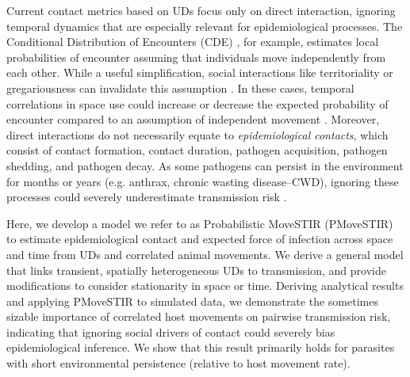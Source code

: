 \documentclass[letterpaper]{article}
\begin{document}
Current contact metrics based on UDs focus only on direct interaction, ignoring temporal dynamics that are especially relevant for epidemiological processes. The Conditional Distribution of Encounters (CDE) \citep{Noonan2021}, for example, estimates local probabilities of encounter assuming that individuals move independently from each other.
While a useful simplification, social interactions like territoriality or gregariousness can invalidate this assumption \citep{Manlove2018,Sah2018}. In these cases, temporal correlations in space use could increase or decrease the expected probability of encounter compared to an assumption of independent movement \citep{Kjaer2008,Schauber2015a}. 
Moreover, direct interactions do not necessarily equate to \emph{epidemiological contacts}, which consist of contact formation, contact duration, pathogen acquisition, pathogen shedding, and pathogen decay. As some pathogens can persist in the environment for months or years (e.g. anthrax, chronic wasting disease--CWD), ignoring these processes could severely underestimate transmission risk \citep{Wilber2022,Yang2023,Richardson2015}.


Here, we develop a model we refer to as Probabilistic MoveSTIR (PMoveSTIR) to estimate epidemiological contact and expected force of infection across space and time from UDs and correlated animal movements. We derive a general model that links transient, spatially heterogeneous UDs to transmission, and provide modifications to consider stationarity in space or time.
Deriving analytical results and applying PMoveSTIR to simulated data, we demonstrate the sometimes sizable importance of correlated host movements on pairwise transmission risk, indicating that ignoring social drivers of contact could severely bias epidemiological inference. We show that this result primarily holds for parasites with short environmental persistence (relative to host movement rate). %
\end{document}
